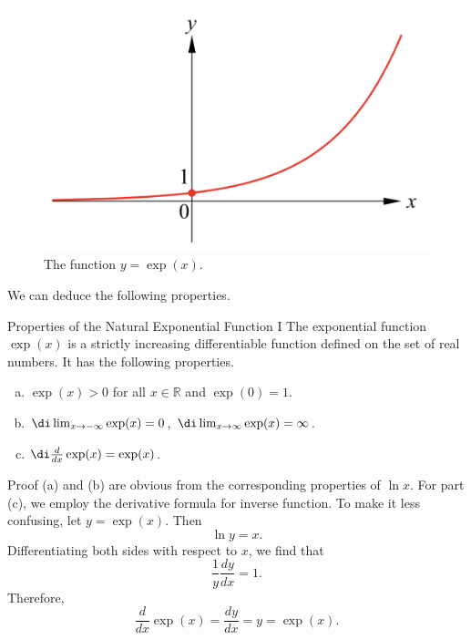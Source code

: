 \begin{figure}[ht]
\centering
\includegraphics[scale=0.2]{Picture27.png}
\caption{  The function $y=\exp(x)$.\fa}\label{figure27}
\end{figure}
We can deduce the following properties.
\begin{proposition}{Properties of the Natural Exponential Function I}
The exponential function $\exp(x)$ is a strictly increasing differentiable function defined on the set of real numbers. It has the following properties.
\begin{enumerate}[(a)]
\item $\exp(x)>0$ for all $x\in\mathbb{R}$ and $\exp(0)=1$.
\item $\di\lim_{x\to-\infty}\exp(x)=0$, $\di\lim_{x\to \infty}\exp(x)=\infty$.
\item $\di\frac{d}{dx}\exp(x)=\exp(x)$.


\end{enumerate}
\end{proposition}
\begin{myproof}{Proof}
(a) and (b) are obvious from the corresponding properties of $\ln x$.
 For part (c), we employ the derivative formula for inverse function. To make it less confusing, let $y=\exp(x)$. Then
\[\ln y=x.\]
Differentiating both sides with respect to $x$, we find that
\[ \frac{1}{y}\frac{dy}{dx}=1.\]Therefore,
\[\frac{d}{dx}\exp(x)=\frac{dy}{dx}=y=\exp(x).\]

\end{myproof}

